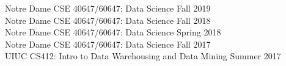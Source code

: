 \documentclass[margin, 9pt]{res}
\begin{document}
\begin{resume}
{{Notre Dame CSE 40647/60647:} Data Science} \hfill{Fall 2019} \\
{{Notre Dame CSE 40647/60647:} Data Science} \hfill{Fall 2018} \\
{{Notre Dame CSE 40647/60647:} Data Science} \hfill{Spring 2018} \\
{{Notre Dame CSE 40647/60647:} Data Science} \hfill{Fall 2017} \\
{{UIUC CS412:} Intro to Data Warehousing and Data Mining} \hfill{Summer 2017}


\end{resume}
\end{document}
